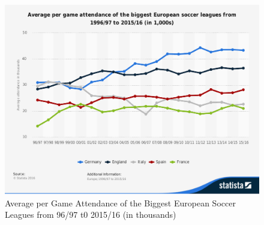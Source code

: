 \documentclass[inte,blindrev]{informs3}
\begin{document}
\begin{figure}
\FIGURE
{\includegraphics[width=1.0\textwidth]{Figure2}}
{Average per Game Attendance of the Biggest European Soccer Leagues from 96/97 t0 2015/16 (in thousands)\label{Fig2}}
{}
\end{figure}
\end{document}
